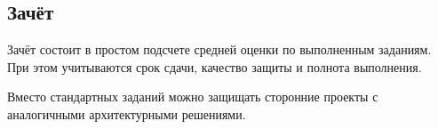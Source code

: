 \documentclass{article}
\begin{document}
\subsection{Зачёт}

Зачёт состоит в простом подсчете средней оценки по выполненным заданиям.
При этом учитываются срок сдачи, качество защиты и полнота выполнения.

Вместо стандартных заданий можно защищать сторонние проекты
с аналогичными архитектурными решениями.
\end{document}
